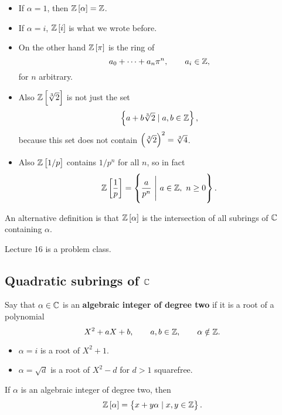 \begin{example*}
\hfill
\begin{itemize}
\item If $ \alpha = 1 $, then $ \Z\sbr{\alpha} = \Z $.
\item If $ \alpha = i $, $ \Z\sbr{i} $ is what we wrote before.
\item On the other hand $ \Z\sbr{\pi} $ is the ring of
$$ a_0 + \dots + a_n\pi^n, \qquad a_i \in \mathbb{Z}, $$
for $ n $ arbitrary.
\item Also $ \Z\sbr{\sqrt[3]{2}} $ is not just the set
$$ \cbr{a + b\sqrt[3]{2} \mid a, b \in \Z}, $$
because this set does not contain $ \br{\sqrt[3]{2}}^2 = \sqrt[3]{4} $.
\item Also $ \Z\sbr{1 / p} $ contains $ 1 / p^n $ for all $ n $, so in fact
$$ \Z\sbr{\dfrac{1}{p}} = \cbr{\dfrac{a}{p^n} \ \Bigg| \ a \in \Z, \ n \ge 0}. $$
\end{itemize}
\end{example*}

An alternative definition is that $ \Z\sbr{\alpha} $ is the intersection of all subrings of $ \mathbb{C} $ containing $ \alpha $.


Lecture 16 is a problem class.


\subsection{Quadratic subrings of \texorpdfstring{$ \mathbb{C} $}{C}}

\begin{definition}
Say that $ \alpha \in \mathbb{C} $ is an \textbf{algebraic integer of degree two} if it is a root of a polynomial
$$ X^2 + aX + b, \qquad a, b \in \mathbb{Z}, \qquad \alpha \notin \mathbb{Z}. $$
\end{definition}

\begin{example*}
\hfill
\begin{itemize}
\item $ \alpha = i $ is a root of $ X^2 + 1 $.
\item $ \alpha = \sqrt{d} $ is a root of $ X^2 - d $ for $ d > 1 $ squarefree.
\end{itemize}
\end{example*}

\pagebreak

\begin{proposition}
If $ \alpha $ is an algebraic integer of degree two, then
$$ \Z\sbr{\alpha} = \cbr{x + y\alpha \mid x, y \in \Z}. $$
\end{proposition}

